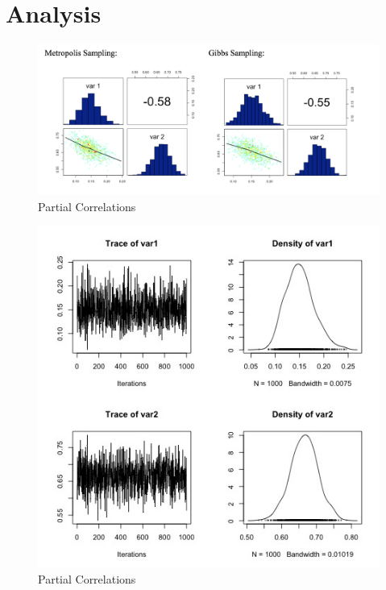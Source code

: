 \documentclass[11pt,a4paper]{article}
\begin{document}


\section*{Analysis}
\begin{figure}[h!]
  \includegraphics[scale=0.8]{images/correlation.png}
  \caption{Partial Correlations}
  \label{fig:birds}
\end{figure}

\begin{figure}[h!]
  \includegraphics[scale=0.8]{images/gibbs_100 | 0.jpg}
  \caption{Partial Correlations}
  \label{fig:birds}
\end{figure}


\end{document}
